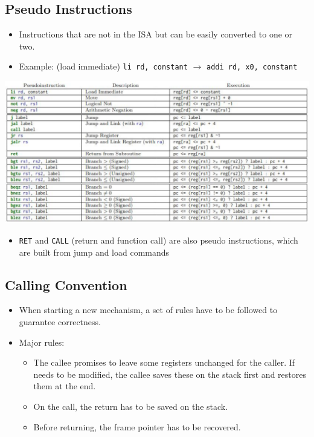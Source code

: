 \documentclass[10pt]{article}
\begin{document}
\subsection*{Pseudo Instructions}
\begin{itemize}
    \item Instructions that are not in the ISA but can be easily converted to one or two.
    \item Example: (load immediate) \texttt{li rd, constant} $\rightarrow$ \texttt{addi rd, x0, constant}
\end{itemize}
\begin{center}
    \includegraphics*[scale=0.6]{W1_7.png}
\end{center}
\begin{itemize}
    \item \texttt{RET} and \texttt{CALL} (return and function call) are also pseudo instructions, which are built from jump and load commands
\end{itemize}
\subsection*{Calling Convention}
\begin{itemize}
    \item When starting a new mechanism, a set of rules have to be followed to guarantee correctness.
    \item Major rules:
    \begin{itemize}
        \item The callee promises to leave some registers unchanged for the caller.  If needs to be modified, the callee saves these on the stack first and restores them at the end.
        \item On the call, the return has to be saved on the stack.
        \item Before returning, the frame pointer has to be recovered.
    \end{itemize}
\end{itemize}
\end{document}
